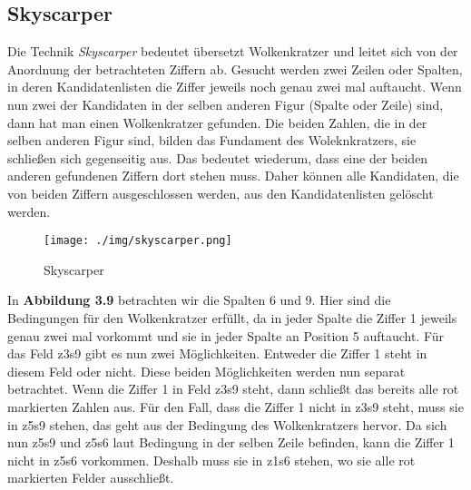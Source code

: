 \subsection{Skyscarper}
\label{Skyscarper}
Die Technik \textit{Skyscarper} bedeutet übersetzt Wolkenkratzer und leitet sich von der Anordnung der betrachteten Ziffern ab. Gesucht werden zwei Zeilen oder Spalten, in deren Kandidatenlisten die Ziffer jeweils noch genau zwei mal auftaucht. Wenn nun zwei der Kandidaten in der selben anderen Figur (Spalte oder Zeile) sind, dann hat man einen Wolkenkratzer gefunden. Die beiden Zahlen, die in der selben anderen Figur sind, bilden das Fundament des Woleknkratzers, sie schließen sich gegenseitig aus. Das bedeutet wiederum, dass eine der beiden anderen gefundenen Ziffern dort stehen muss. Daher können alle Kandidaten, die von beiden Ziffern ausgeschlossen werden, aus den Kandidatenlisten gelöscht werden.	

\begin{figure}[h]
\begin{center}
\texttt{[image: ./img/skyscarper.png]}
\caption{Skyscarper}
\end{center}
\end{figure}

In \textbf{Abbildung 3.9} betrachten wir die Spalten 6 und 9. Hier sind die Bedingungen für den Wolkenkratzer erfüllt, da in jeder Spalte die Ziffer 1 jeweils genau zwei mal vorkommt und sie in jeder Spalte an Position 5 auftaucht. Für das Feld z3s9 gibt es nun zwei Möglichkeiten. Entweder die Ziffer 1 steht in diesem Feld oder nicht. Diese beiden Möglichkeiten werden nun separat betrachtet. Wenn die Ziffer 1 in Feld z3s9 steht, dann schließt das bereits alle rot markierten Zahlen aus. Für den Fall, dass die Ziffer 1 nicht in z3s9 steht, muss sie in z5s9 stehen, das geht aus der Bedingung des Wolkenkratzers hervor. Da sich nun z5s9 und z5s6 laut Bedingung in der selben Zeile befinden, kann die Ziffer 1 nicht in z5s6 vorkommen. Deshalb muss sie in z1s6 stehen, wo sie alle rot markierten Felder ausschließt.